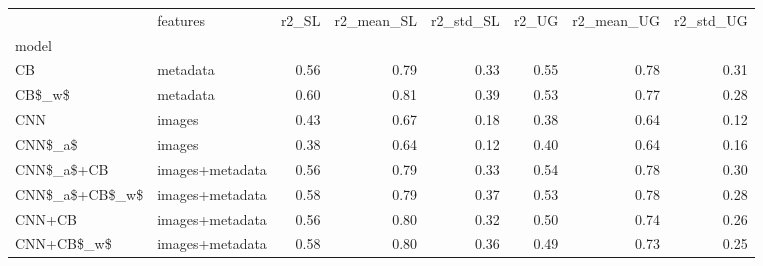 \begin{tabular}{llrrrrrr}
\toprule
{} &         features &  r2\_SL &  r2\_mean\_SL &  r2\_std\_SL &  r2\_UG &  r2\_mean\_UG &  r2\_std\_UG \\
model          &                  &        &             &            &        &             &            \\
\midrule
CB             &         metadata &   0.56 &        0.79 &       0.33 &   0.55 &        0.78 &       0.31 \\
CB\$\_w\$         &         metadata &   0.60 &        0.81 &       0.39 &   0.53 &        0.77 &       0.28 \\
CNN            &           images &   0.43 &        0.67 &       0.18 &   0.38 &        0.64 &       0.12 \\
CNN\$\_a\$        &           images &   0.38 &        0.64 &       0.12 &   0.40 &        0.64 &       0.16 \\
CNN\$\_a\$+CB     &  images+metadata &   0.56 &        0.79 &       0.33 &   0.54 &        0.78 &       0.30 \\
CNN\$\_a\$+CB\$\_w\$ &  images+metadata &   0.58 &        0.79 &       0.37 &   0.53 &        0.78 &       0.28 \\
CNN+CB         &  images+metadata &   0.56 &        0.80 &       0.32 &   0.50 &        0.74 &       0.26 \\
CNN+CB\$\_w\$     &  images+metadata &   0.58 &        0.80 &       0.36 &   0.49 &        0.73 &       0.25 \\
\bottomrule
\end{tabular}
